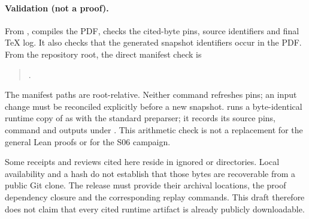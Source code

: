 \paragraph{Validation (not a proof).}
From ,  compiles the PDF,
checks the cited-byte pins, source identifiers and final TeX log.
It also checks that the generated snapshot identifiers occur in the
PDF. From the repository root, the direct manifest check is
\begin{quote}\small
{}.
\end{quote}
The manifest paths are root-relative. Neither command refreshes pins;
an input change must be reconciled explicitly before a new snapshot.
 runs a byte-identical runtime copy of
 as 
with the standard preparser;
it records its source pins, command and outputs under .
This arithmetic check is not a replacement for the general Lean
proofs or for the S06 campaign.

Some receipts and reviews cited here reside in ignored 
or  directories. Local availability and a hash do not
establish that those bytes are recoverable from a public Git clone.
The release must provide their archival locations, the proof dependency
closure and the corresponding replay commands. This draft therefore
does not claim that every cited runtime artifact is already publicly
downloadable.
